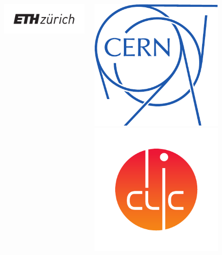 \documentclass[hyperref={colorlinks=true,pdfpagelabels=false,linkcolor=black}, xcolor=dvipsnames,10pt]{beamer}
\begin{document}
{\begin{frame}[plain]
\begin{columns}
      \centering
      \includegraphics[width=\textwidth]{figures/ETHZ_logo.pdf}
      \begin{columns}
        \centering
        \includegraphics[width=0.8\textwidth]{figures/logo_cern.pdf}
        \centering
        \includegraphics[width=0.8\textwidth]{figures/logo_clic.pdf}

\end{columns}
\end{columns}
\end{frame}}
\end{document}
